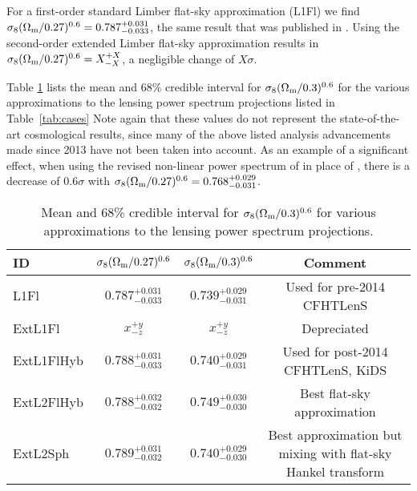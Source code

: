 For a first-order standard Limber flat-sky approximation (L1Fl) we find
$\sigma_8 (\Omega_{\rm m}/0.27)^{0.6} =0.787^{+0.031}_{-0.033}$, the same
result that was published in \cite{CFHTLenS-2pt-notomo}. Using the second-order
extended Limber flat-sky approximation results in $\sigma_8 (\Omega_{\rm
m}/0.27)^{0.6} =X^{+X}_{-X}$, a negligible change of $X\sigma$. 

Table \ref{tab:CFHTLenS_Sigma8} lists the mean and 68\% credible interval for
$\sigma_8 (\Omega_{\rm m}/0.3)^{0.6}$ for the various approximations to the
lensing power spectrum projections listed in Table~\ref{tab:cases} Note again
that these values do not represent the state-of-the-art cosmological results,
since many of the above listed analysis advancements made since 2013 have not
been taken into account. As an example of a significant effect, when using the
revised non-linear power spectrum of \cite{2012ApJ...761..152T} in place of
\cite{2003MNRAS.341.1311S}, there is a decrease of $0.6 \sigma$ with $\sigma_8
(\Omega_{\rm m}/0.27)^{0.6} =0.768^{+0.029}_{-0.031}$.


\renewcommand{\baselinestretch}{1.5}
\begin{table}

  \label{tab:CFHTLenS_Sigma8}

  \caption{Mean and 68\% credible interval for 
  $\sigma_8 (\Omega_{\rm m}/0.3)^{0.6}$ for various approximations to the lensing
  power spectrum projections.}

  \begin{tabular}{lccc} \hline
  ID         & $\sigma_8 (\Omega_{\rm m}/0.27)^{0.6}$ & $\sigma_8 (\Omega_{\rm m}/0.3)^{0.6}$ & Comment \\ \hline
  L1Fl       & $0.787^{+0.031}_{-0.033}$ & $0.739^{+0.029}_{-0.031}$ & Used for pre-2014 CFHTLenS \\
  ExtL1Fl    & $x^{+y}_{-z}$ & $x^{+y}_{-z}$ & Depreciated \\
  ExtL1FlHyb & $0.788^{+0.031}_{-0.033}$ & $0.740^{+0.029}_{-0.031}$ & Used for post-2014 CFHTLenS, KiDS \\
  ExtL2FlHyb & $0.788^{+0.032}_{-0.032}$ & $0.749^{+0.030}_{-0.030}$ & Best flat-sky approximation \\
  ExtL2Sph   & $0.789^{+0.031}_{-0.032}$ & $0.740^{+0.029}_{-0.030}$ & Best approximation but mixing with flat-sky Hankel transform \\ \hline
  \end{tabular}

\end{table}
\renewcommand{\baselinestretch}{1}


